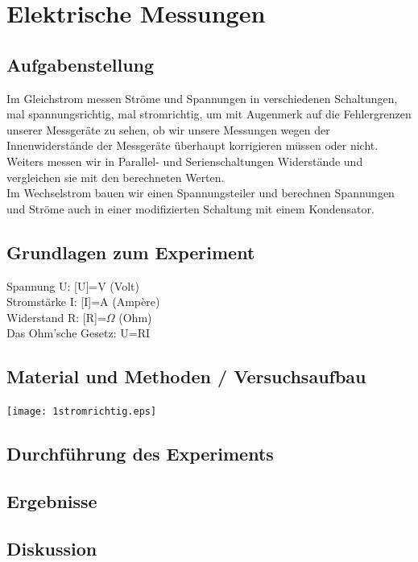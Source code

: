\documentclass{article}
\begin{document}
\section{Elektrische Messungen}
\subsection{Aufgabenstellung}
Im Gleichstrom messen Ströme und Spannungen in verschiedenen Schaltungen, mal spannungsrichtig, mal stromrichtig, um mit Augenmerk auf die Fehlergrenzen unserer Messgeräte zu sehen, ob wir unsere Messungen wegen der Innenwiderstände der Messgeräte überhaupt korrigieren müssen oder nicht.\\
Weiters messen wir in Parallel- und Serienschaltungen Widerstände und vergleichen sie mit den berechneten Werten.\\
Im Wechselstrom bauen wir einen Spannungsteiler und berechnen Spannungen und Ströme auch in einer modifizierten Schaltung mit einem Kondensator.
\\
\subsection{Grundlagen zum Experiment}
Spannung U: [U]=V (Volt)\\
Stromstärke I: [I]=A (Ampère)\\
Widerstand R: [R]=$\Omega$ (Ohm)\\

Das Ohm'sche Gesetz: U=RI

\subsection{Material und Methoden / Versuchsaufbau}
\texttt{[image: 1stromrichtig.eps]}

\subsection{Durchführung des Experiments}

\subsection{Ergebnisse}

\subsection{Diskussion}
\end{document}
